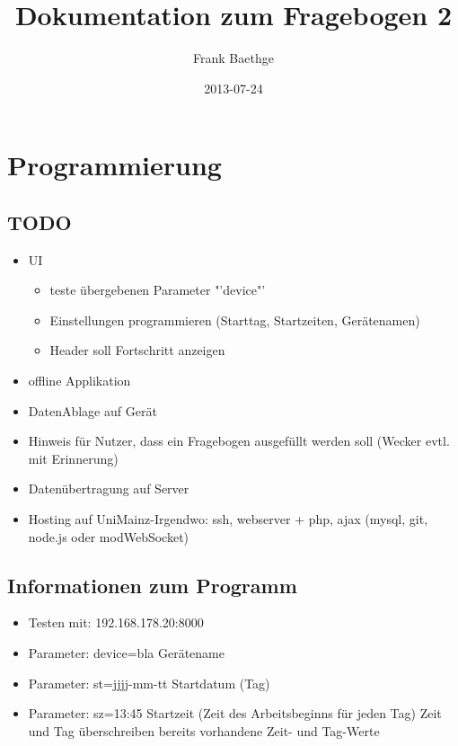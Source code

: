 \documentclass[a4paper]{scrartcl}
\title{Dokumentation zum Fragebogen 2}
\author{Frank Baethge}
\date{2013-07-24}
\begin{document}
	\section{Programmierung}

		\subsection{TODO}
			\begin{itemize}
				\item UI

					\begin{itemize}
						\item teste übergebenen Parameter "'device"'
						\item Einstellungen programmieren (Starttag, Startzeiten, Gerätenamen)
						\item Header soll Fortschritt anzeigen
					\end{itemize}
				\item offline Applikation
				\item DatenAblage auf Gerät
				\item Hinweis für Nutzer, dass ein Fragebogen ausgefüllt werden soll (Wecker evtl. mit Erinnerung)
				\item Datenübertragung auf Server
				\item Hosting auf UniMainz-Irgendwo: ssh, webserver + php, ajax (mysql, git, node.js oder modWebSocket)
			\end{itemize}

		\subsection{Informationen zum Programm}
			\begin{itemize}
				\item Testen mit: 192.168.178.20:8000
				\item Parameter: device=bla \rightarrow Gerätename
				\item Parameter: st=jjjj-mm-tt \rightarrow Startdatum (Tag)
				\item Parameter: sz=13:45 \rightarrow Startzeit (Zeit des Arbeitsbeginns für jeden Tag)\newline
					Zeit und Tag überschreiben bereits vorhandene Zeit- und Tag-Werte
			\end{itemize}
\end{document}
